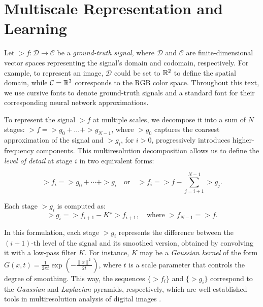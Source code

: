



\section{Multiscale Representation and Learning}
\label{s-motivation}

Let $\gt{f}:\mathcal{D}\to \mathcal{C}$ be a \textit{ground-truth signal}, where $\mathcal{D}$ and $\mathcal{C}$ are finite-dimensional vector spaces representing the signal's domain and codomain, respectively. For example, to represent an image, $\mathcal{D}$ could be set to $\mathbb{R}^2$ to define the spatial domain, while $\mathcal{C}=\mathbb{R}^3$ corresponds to the RGB color space. Throughout this text, we use cursive fonts to denote ground-truth signals and a standard font for their corresponding neural network approximations.

To represent the signal $\gt{f}$ at multiple scales, we decompose it into a sum of $N$ stages: $\gt{f}=\gt{g}_0+\dots+\gt{g}_{N-1}$, where $\gt{g}_0$ captures the coarsest approximation of the signal and $\gt{g}_i$, for $i>0$, progressively introduces higher-frequency components. This multiresolution decomposition allows us to define the \textit{level of detail} at stage $i$ in two equivalent forms:

\begin{equation}
\gt{f}_i = \gt{g}_0 + \cdots + \gt{g}_i \quad \text{or} \quad \gt{f}_i = \gt{f} - \sum_{j=i+1}^{N-1} \gt{g}_j.
\end{equation}

Each stage $\gt{g}_i$ is computed as:
\begin{equation}
\gt{g}_i = \gt{f}_{i+1} - K * \gt{f}_{i+1}, \quad \text{where } \gt{f}_{N-1} = \gt{f}.
\end{equation}

In this formulation, each stage $\gt{g}_i$ represents the difference between the $(i+1)$-th level of the signal and its smoothed version, obtained by convolving it with a low-pass filter $K$. For instance, $K$ may be a \textit{Gaussian kernel} of the form $G(x,t)=\frac{1}{2\pi t}\exp{\left(-\frac{\|x\|^2}{2t}\right)}$, where $t$ is a scale parameter that controls the degree of smoothing. This way, the sequences $\{\gt{f}_i\}$ and $\{\gt{g}_i\}$ correspond to the \textit{Gaussian} and \textit{Laplacian} pyramids, respectively, which are well-established tools in multiresolution analysis of digital images \citep{lindeberg1994scale, velho2009image, rosenfeld2013multiresolution}.

